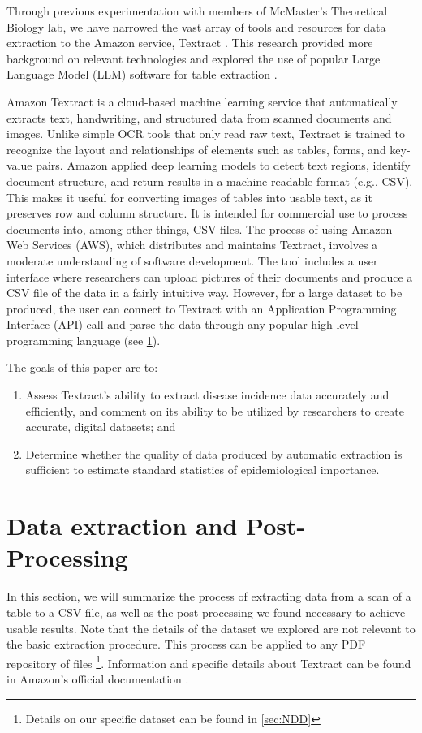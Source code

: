 \documentclass[12pt]{article}
\begin{document}
Through previous experimentation with members of McMaster's Theoretical Biology lab, we have narrowed the vast array of tools and resources for data extraction to the Amazon service, Textract \cite{aws_textract}. This research provided more background on relevant technologies and explored the use of popular Large Language Model (LLM) software for table extraction \cite{stewart}. 

Amazon Textract is a cloud-based machine learning service that automatically extracts text, handwriting, and structured data from scanned documents and images. Unlike simple OCR tools that only read raw text, Textract is trained to recognize the layout and relationships of elements such as tables, forms, and key-value pairs. Amazon applied deep learning models to detect text regions, identify document structure, and return results in a machine-readable format (e.g., CSV). This makes it useful for converting images of tables into usable text, as it preserves row and column structure. It is intended for commercial use to process documents into, among other things, CSV files. The process of using Amazon Web Services (AWS), which distributes and maintains Textract, involves a moderate understanding of software development. The tool includes a user interface where researchers can upload pictures of their documents and produce a CSV file of the data in a fairly intuitive way. However, for a large dataset to be produced, the user can connect to Textract with an Application Programming Interface (API) call and parse the data through any popular high-level programming language (see \cref{sec:data-extraction}).

The goals of this paper are to:
\begin{enumerate}
\item Assess Textract's ability to extract disease incidence data accurately and efficiently, and comment on its ability to be utilized by researchers to create accurate, digital datasets; and
\item Determine whether the quality of data produced by automatic extraction is sufficient to estimate standard statistics of epidemiological importance.
\end{enumerate}
\section{Data extraction and Post-Processing} \label{sec:data-extraction}

In this section, we will summarize the process of extracting data from a scan of a table to a CSV file, as well as the post-processing we found necessary to achieve usable results. Note that the details of the dataset we explored are not relevant to the basic extraction procedure. This process can be applied to any PDF repository of files \footnote{Details on our specific dataset can be found in \cref{sec:NDD}}. Information and specific details about Textract can be found in Amazon's official documentation \cite{awsdocumentation}. 
\end{document}
